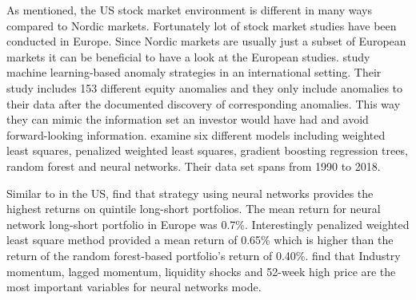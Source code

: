 \documentclass[12pt]{article}
\begin{document}
As mentioned, the US stock market environment is different in many ways compared to Nordic markets. Fortunately lot of stock market studies have been conducted in Europe. Since Nordic markets are usually just a subset of European markets it can be beneficial to have a look at the European studies. \citet{TOBEK2021100588} study machine learning-based anomaly strategies in an international setting. Their study includes 153 different equity anomalies and they only include anomalies to their data after the documented discovery of corresponding anomalies. This way they can mimic the information set an investor would have had and avoid forward-looking information. \citeauthor{TOBEK2021100588} examine six different models including weighted least squares, penalized weighted least squares, gradient boosting regression trees, random forest and neural networks. Their data set spans from 1990 to 2018.\footnotemark {}\par

Similar to \citet{guetal} in the US, \citeauthor{TOBEK2021100588} find that strategy using neural networks provides the highest returns on quintile long-short portfolios. The mean return for neural network long-short portfolio in Europe was 0.7\%. Interestingly penalized weighted least square method provided a mean return of 0.65\% which is higher than the return of the random forest-based portfolio's return of 0.40\%. \citeauthor{TOBEK2021100588} find that Industry momentum, lagged momentum, liquidity shocks and  52-week high price are the most important variables for neural networks mode.\footnotemark {} \par
\end{document}
